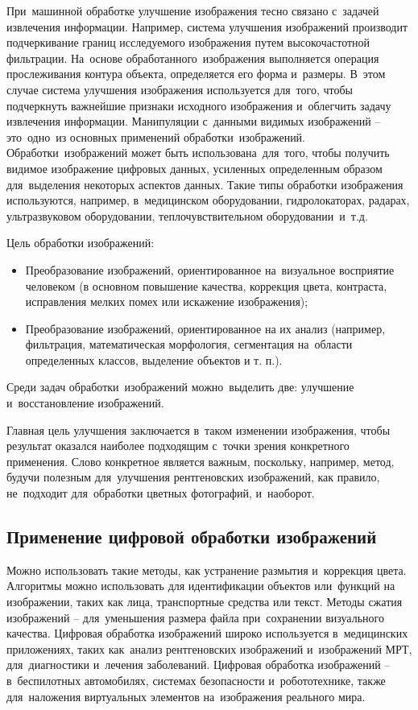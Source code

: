 \documentclass{ou}
\begin{document}
При~машинной обработке улучшение изображения тесно связано с~задачей извлечения информации. Например, система улучшения изображений производит подчеркивание границ исследуемого изображения путем высокочастотной фильтрации. На~основе обработанного~изображения выполняется операция прослеживания контура объекта, определяется его форма и~размеры. В~этом случае система улучшения изображения используется для~того, чтобы подчеркнуть важнейшие признаки исходного изображения и~облегчить задачу извлечения информации. Манипуляции с~данными видимых изображений -- это~одно~из основных применений обработки~изображений. Обработки~изображений может быть использована~для~того, чтобы получить видимое изображение цифровых данных, усиленных определенным образом для~выделения некоторых аспектов данных. Такие типы обработки изображения используются, например, в~медицинском оборудовании, гидролокаторах, радарах, ультразвуковом оборудовании, теплочувствительном оборудовании~и~т.д.

Цель обработки изображений:
\begin{itemize}[label=-, itemindent=2em, nosep]
\item Преобразование изображений, ориентированное на~визуальное восприятие человеком (в основном повышение качества, коррекция цвета, контраста, исправления мелких помех или искажение изображения);
\item Преобразование изображений, ориентированное на их анализ (например, фильтрация, математическая морфология, сегментация на~области определенных классов, выделение объектов и т. п.).
\end{itemize}

Среди задач обработки~изображений можно~выделить две: улучшение и~восстановление изображений.

Главная цель улучшения заключается в~таком изменении изображения, чтобы результат оказался наиболее подходящим с~точки зрения конкретного применения. Слово конкретное является важным, поскольку, например, метод, будучи полезным для~улучшения рентгеновских изображений, как правило, не~подходит для~обработки цветных фотографий, и~наоборот.
\subsection{Применение цифровой обработки изображений}
Можно использовать такие методы, как устранение размытия и~коррекция цвета. Алгоритмы можно использовать для идентификации объектов или~функций на изображении, таких как лица, транспортные средства или текст. Методы сжатия изображений -- для~уменьшения размера файла при~сохранении визуального качества. Цифровая обработка изображений широко используется в~медицинских приложениях, таких как~анализ рентгеновских изображений и~изображений МРТ, для~диагностики и~лечения заболеваний. Цифровая обработка изображений -- в~беспилотных автомобилях, системах безопасности и~робототехнике, также для~наложения виртуальных элементов на~изображения реального мира.
\end{document}
